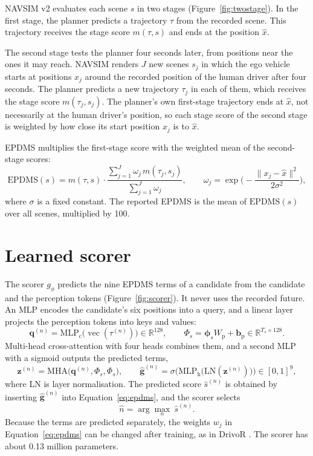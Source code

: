 \documentclass[11pt, a4paper, oneside]{book}
\begin{document}
NAVSIM v2 evaluates each scene $s$ in two stages \cite{pseudosim} (Figure~\ref{fig:twostage}).
In the first stage, the planner predicts a trajectory $\tau$ from the recorded scene. This
trajectory receives the stage score $m(\tau,s)$ and ends at the position $\hat{x}$.

The second stage tests the planner four seconds later, from positions near the ones it may
reach. NAVSIM renders $J$ new scenes $s_j$ in which the ego vehicle starts at positions $x_j$
around the recorded position of the human driver after four seconds. The planner predicts a new
trajectory $\tau_j$ in each of them, which receives the stage score $m(\tau_j,s_j)$. The planner's own
first-stage trajectory ends at $\hat{x}$, not necessarily at the human driver's position, so
each stage score of the second stage is weighted by how close its start position $x_j$ is to
$\hat{x}$.

EPDMS multiplies the first-stage score with the weighted mean of the second-stage scores:
\begin{equation}
  \mathrm{EPDMS}(s)=m(\tau,s)\cdot\frac{\sum_{j=1}^{J}\omega_j\,m(\tau_j,s_j)}
  {\sum_{j=1}^{J}\omega_j},\qquad
  \omega_j=\exp\!\Big(-\frac{\lVert x_j-\hat{x}\rVert^2}{2\sigma^2}\Big),
\end{equation}
where $\sigma$ is a fixed constant. The reported EPDMS is the mean of $\mathrm{EPDMS}(s)$ over
all scenes, multiplied by 100.



\section{Learned scorer}
\label{sec:selection}
The scorer $g_\phi$ predicts the nine EPDMS terms of a candidate from the candidate and the
perception tokens (Figure~\ref{fig:scorer}). It never uses the recorded future. An MLP encodes
the candidate's six positions into a query, and a linear layer projects the perception tokens
into keys and values:
\begin{equation}
  \mathbf{q}^{(n)}=\mathrm{MLP}_{\mathrm{c}}\big(\operatorname{vec}(\tau^{(n)})\big)\in\mathbb{R}^{128},
  \qquad \Phi_s=\boldsymbol{\phi}_sW_{\mathrm{p}}+\mathbf{b}_{\mathrm{p}}\in\mathbb{R}^{T_s\times128}.
\end{equation}
Multi-head cross-attention with four heads combines them, and a second MLP with a sigmoid
outputs the predicted terms,
\begin{equation}
  \mathbf{z}^{(n)}=\mathrm{MHA}\big(\mathbf{q}^{(n)},\Phi_s,\Phi_s\big),\qquad
  \hat{\mathbf{g}}^{(n)}=\sigma\Big(\mathrm{MLP}_{\mathrm{h}}\big(\mathrm{LN}(\mathbf{z}^{(n)})\big)\Big)
  \in[0,1]^9,
\end{equation}
where LN is layer normalisation. The predicted score $\hat{s}^{(n)}$ is obtained by inserting
$\hat{\mathbf{g}}^{(n)}$ into Equation~\eqref{eq:epdms}, and the scorer selects
\begin{equation}
  \hat{n}=\arg\max_{n}\ \hat{s}^{(n)} .
\end{equation}
Because the terms are predicted separately, the weights $w_j$ in Equation~\eqref{eq:epdms} can
be changed after training, as in DrivoR \cite{drivor}. The scorer has about \num{0.13} million
parameters.
\end{document}
